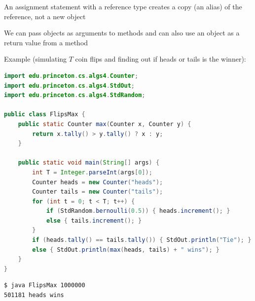 \documentclass[8pt,a4paper,compress]{beamer}
\begin{document}
\begin{frame}[fragile]
An assignment statement with a reference type creates a copy (an alias) of the reference, not a new object

\bigskip

We can pass objects as arguments to methods and can also use an object as a return value from a method

\bigskip

Example (simulating $T$ coin flips and finding out if heads or tails is the winner):
\begin{lstlisting}[language=Java]
import edu.princeton.cs.algs4.Counter;
import edu.princeton.cs.algs4.StdOut;
import edu.princeton.cs.algs4.StdRandom;

public class FlipsMax {
    public static Counter max(Counter x, Counter y) {
        return x.tally() > y.tally() ? x : y;
    }

    public static void main(String[] args) {
        int T = Integer.parseInt(args[0]);
        Counter heads = new Counter("heads");
        Counter tails = new Counter("tails");
        for (int t = 0; t < T; t++) {
            if (StdRandom.bernoulli(0.5)) { heads.increment(); }
            else { tails.increment(); }
        }
        if (heads.tally() == tails.tally()) { StdOut.println("Tie"); }
        else { StdOut.println(max(heads, tails) + " wins"); }
    }
}
\end{lstlisting}

\begin{lstlisting}[language={}]
$ java FlipsMax 1000000
501181 heads wins
\end{lstlisting}
\end{frame}
\end{document}
